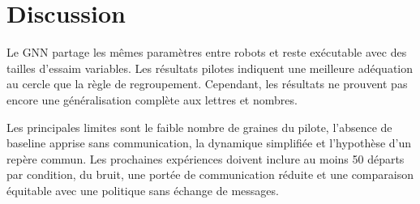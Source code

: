 \chapter{Discussion}
\label{chap:discussion}

Le GNN partage les mêmes paramètres entre robots et reste exécutable avec des tailles d'essaim variables. Les résultats pilotes indiquent une meilleure adéquation au cercle que la règle de regroupement. Cependant, les résultats ne prouvent pas encore une généralisation complète aux lettres et nombres.

Les principales limites sont le faible nombre de graines du pilote, l'absence de baseline apprise sans communication, la dynamique simplifiée et l'hypothèse d'un repère commun. Les prochaines expériences doivent inclure au moins 50 départs par condition, du bruit, une portée de communication réduite et une comparaison équitable avec une politique sans échange de messages.
